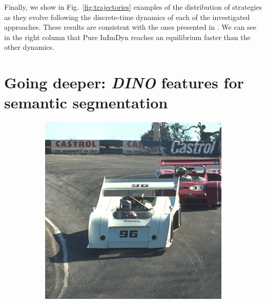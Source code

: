 \documentclass[11pt,a4paper]{article}
\begin{document}
Finally, we show in Fig.~\ref{fig:trajectories} examples of the distribution of strategies as they evolve following the discrete-time dynamics of each of the investigated approaches. These results are consistent with the ones presented in \cite{game-clustering}. We can see in the right column that Pure InImDyn reaches an equilibrium faster than the other dynamics.

\section{Going deeper: \textit{DINO} features for semantic segmentation}
\label{sec:dino}

\begin{figure}
    \centering
    \begin{subfigure}[b]{0.3\textwidth}
        \centering
        \includegraphics[width=\textwidth]{figures/dino/tile_1/21077.jpg}

\end{subfigure}
\end{figure}
\end{document}
